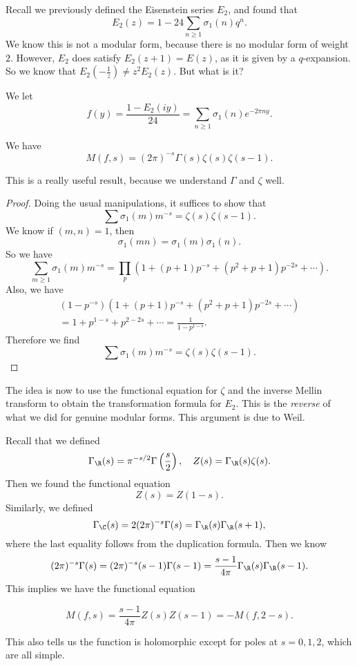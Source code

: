 \documentclass[a4paper]{article}
\begin{document}
Recall we previously defined the Eisenstein series $E_2$, and found that
\[
  E_2(z) = 1 - 24 \sum_{n \geq 1} \sigma_1(n) q^n.
\]
We know this is not a modular form, because there is no modular form of weight $2$. However, $E_2$ does satisfy $E_2(z + 1) = E(z)$, as it is given by a $q$-expansion. So we know that $E_2(-\frac{1}{z}) \not= z^2 E_2(z)$. But what is it?

We let
\[
  f(y) = \frac{1 - E_2(iy)}{24} = \sum_{n \geq 1} \sigma_1(n) e^{-2\pi n y}.
\]
\begin{prop}
  We have
  \[
    M(f, s) = (2\pi)^{-s} \Gamma(s) \zeta(s) \zeta(s - 1).
  \]
\end{prop}
This is a really useful result, because we understand $\Gamma$ and $\zeta$ well.

\begin{proof}
  Doing the usual manipulations, it suffices to show that
  \[
    \sum \sigma_1(m) m^{-s} = \zeta(s) \zeta(s - 1).
  \]
  We know if $(m, n) = 1$, then
  \[
    \sigma_1(mn) = \sigma_1(m) \sigma_1(n).
  \]
  So we have
  \[
    \sum_{m \geq 1} \sigma_1(m) m^{-s} = \prod_p (1 + (p + 1) p^{-s} + (p^2 + p + 1) p^{-2s} + \cdots).
  \]
  Also, we have
  \begin{multline*}
    (1 - p^{-s}) (1 + (p + 1) p^{-s} + (p^2 + p + 1) p^{-2s} + \cdots) \\
    = 1 + p^{1 - s} + p^{2 - 2s} + \cdots = \frac{1}{1 - p^{1 - s}}.
  \end{multline*}
  Therefore we find
  \[
    \sum \sigma_1(m) m^{-s} = \zeta(s) \zeta(s - 1).
  \]
\end{proof}
The idea is now to use the functional equation for $\zeta$ and the inverse Mellin transform to obtain the transformation formula for $E_2$. This is the \emph{reverse} of what we did for genuine modular forms. This argument is due to Weil.

Recall that we defined
\[
  \Gamma_\R(s) = \pi^{-s/2} \Gamma\left(\frac{s}{2}\right),\quad Z(s) = \Gamma_\R(s) \zeta(s).
\]
Then we found the functional equation
\[
  Z(s) = Z(1 - s).
\]
Similarly, we defined
\[
  \Gamma_\C(s) = 2(2\pi)^{-s} \Gamma(s) = \Gamma_\R(s) \Gamma_\R(s + 1),
\]
where the last equality follows from the duplication formula. Then we know
\[
  (2\pi)^{-s} \Gamma(s) = (2\pi)^{-s} (s - 1) \Gamma(s - 1) = \frac{s - 1}{4\pi} \Gamma_\R(s) \Gamma_\R(s - 1).
\]
This implies we have the functional equation
\begin{prop}
  \[
    M(f, s) = \frac{s - 1}{4\pi} Z(s) Z(s - 1) = - M(f, 2 - s).
  \]
\end{prop}
This also tells us the function is holomorphic except for poles at $s = 0, 1, 2$, which are all simple.
\end{document}
